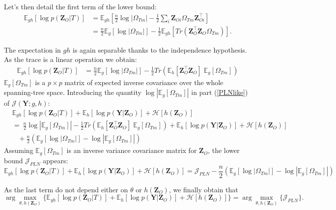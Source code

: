 \documentclass[11pt,a4paper]{article}
\newcommand{\argmax}{\arg\!\max}
\newcommand{\entr}{\mathcal{H}}
\newcommand{\Ybf}{\boldsymbol{Y}}
\newcommand{\Zbf}{\boldsymbol{Z}}
\newcommand{\Esp}{\mathds{E}}
\begin{document}
Let's then detail the first term of the lower bound:
\begin{align*}
\Esp_{gh}[\log p(\Zbf_O|T)] &=  \Esp_{gh} \left[\frac{n}{2} \log |\Omega_{Tm}| - \frac{1}{2} \sum_i \Zbf_{Oi}\Omega_{Tm} \Zbf_{Oi}^\intercal  \right]\\
&= \frac{n}{2} \Esp_g [\log |\Omega_{Tm}|] - \frac{1}{2} \Esp_{gh}\left[Tr\left( \Zbf_O^\intercal \Zbf_O \Omega_{Tm}\right)\right].
\end{align*}

The expectation in $gh$ is again separable thanks to the independence hypothesis. As the trace is a linear operation we obtain:
\begin{align*}
\Esp_{gh}[\log p(\Zbf_O|T)] &=\frac{n}{2} \Esp_g [\log |\Omega_{Tm}|] - \frac{1}{2}  Tr\left(\Esp_h [\Zbf_O^\intercal \Zbf_O ]\; \Esp_g[\Omega_{Tm}]\right) 
\end{align*}
$\Esp_g [\Omega_{Tm}]$ is a $p\times p$ matrix of expected inverse covariance over the whole spanning-tree space. Introducing the quantity  $\log |\Esp_g [\Omega_{Tm}]| $ in part (\ref{PLNlike}) of $\mathcal{J}(\Ybf; g,h)$:
\begin{align*}
&\Esp_{gh}[\log p(\Zbf_O | T)] +\Esp_h[\log p(\Ybf|\Zbf_O)]+ \entr[h(\Zbf_O)]\\
& =\ \frac{n}{2} \log |\Esp_g [\Omega_{Tm}]| - \frac{1}{2}Tr\left(\Esp_h [\Zbf_O^\intercal \Zbf_O ]\; \Esp_g[\Omega_{Tm}]\right)+ \Esp_{h}[\log p(\Ybf|\Zbf_O)] + \entr[h(\Zbf_O)]\\
& \;\;\;+  \frac{n}{2}\left( \Esp_g[\log|\Omega_{Tm}|] - \log|\Esp_g [\Omega_{Tm}]|\right)
\end{align*}
Assuming $\Esp_g [\Omega_{Tm}]$ is an inverse variance covariance matrix for $\Zbf_O$, the lower bound $\mathcal{J}_{PLN}$ appears:
 $$\Esp_{gh}[\log p(\Zbf_O | T)] +\Esp_h[\log p(\Ybf|\Zbf_O)]+ \entr[h(\Zbf_O)] = \mathcal{J}_{PLN} - \frac{n}{2}\left( \Esp_g[\log|\Omega_{Tm}|] - \log|\Esp_g [\Omega_{Tm}]|\right)$$
 
As the last term do not depend either on $\theta$ or $h(\Zbf_O)$, we finally obtain that
 $$ \argmax_{\theta, h(\Zbf_O)} \big\{\Esp_{gh}[\log p(\Zbf_O | T)] +\Esp_h[\log p(\Ybf|\Zbf_O)]+ \entr[h(\Zbf_O)]\big\} = \argmax_{\theta, h(\Zbf_O)} \big\{ \mathcal{J}_{PLN} \big\}.$$
\end{document}
